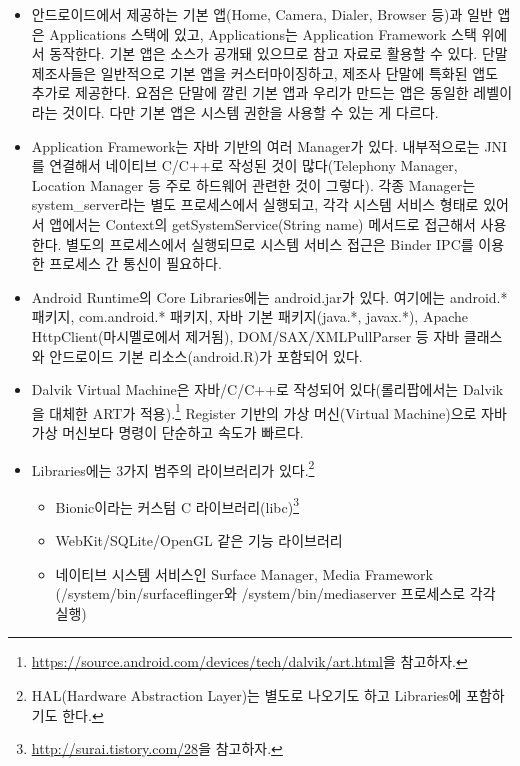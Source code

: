 \begin{itemize}
\item 안드로이드에서 제공하는 기본 앱(Home, Camera, Dialer, Browser 등)과 일반 앱은 Applications 스택에 있고, Applications는 Application Framework 스택 위에서 동작한다. 
기본 앱은 소스가 공개돼 있으므로 참고 자료로 활용할 수 있다. 단말 제조사들은 일반적으로 기본 앱을 커스터마이징하고, 제조사 단말에 특화된 앱도 추가로 제공한다. 
요점은 단말에 깔린 기본 앱과 우리가 만드는 앱은 동일한 레벨이라는 것이다. 다만 기본 앱은 시스템 권한을 사용할 수 있는 게 다르다.

\item Application Framework는 자바 기반의 여러 Manager가 있다. 내부적으로는 JNI를 연결해서 네이티브 C/C++로 작성된 것이 많다(Telephony Manager, Location Manager 등 주로 하드웨어 관련한 것이 그렇다). 
각종 Manager는 system\_server라는 별도 프로세스에서 실행되고, 각각 시스템 서비스 형태로 있어서 앱에서는 Context의 getSystemService(String name) 메서드로 접근해서 사용한다. 
별도의 프로세스에서 실행되므로 시스템 서비스 접근은 Binder IPC를 이용한 프로세스 간 통신이 필요하다.

\item Android Runtime의 Core Libraries에는 android.jar가 있다. 여기에는 android.* 패키지, com.android.* 패키지, 자바 기본 패키지(java.*, javax.*), Apache HttpClient(마시멜로에서 제거됨), DOM/SAX/XM\-LPullParser 등 자바 클래스와 안드로이드 기본 리소스(android.R)가 포함되어 있다.

\item Dalvik Virtual Machine은 자바/C/C++로 작성되어 있다(롤리팝에서는 Dalvik을 대체한 ART가 적용).\footnote{\url{https://source.android.com/devices/tech/dalvik/art.html}을 참고하자.} Register 기반의 가상 머신(Virtual Machine)으로 자바 가상 머신보다 명령이 단순하고 속도가 빠르다.

\item Libraries에는 3가지 범주의 라이브러리가 있다.\footnote{HAL(Hardware Abstraction Layer)는 별도로 나오기도 하고 Libraries에 포함하기도 한다.}
	\begin{itemize}
	\item Bionic이라는 커스텀 C 라이브러리(libc)\footnote{\url{http://surai.tistory.com/28}을 참고하자.}
	\item WebKit/SQLite/OpenGL 같은 기능 라이브러리
	\item 네이티브 시스템 서비스인 Surface Manager, Media Framework\\
	(/system/bin/surfaceflinger와 /system/bin/mediaserver 프로세스로 각각 실행)
\end{itemize}


\end{itemize}
